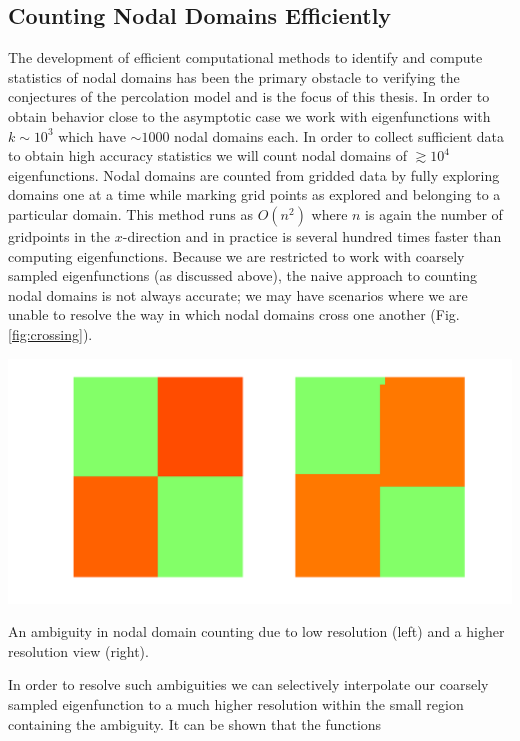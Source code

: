 \documentclass[english]{article}
\makeatletter
\newenvironment{figurehere}
{\def\@captype{figure}}
{}
\makeatother
\begin{document}
\begin{multicols}{2}
\subsection*{Counting Nodal Domains Efficiently}
The development of efficient computational methods to identify and compute statistics of nodal domains has been the primary obstacle to verifying the conjectures of the percolation model and is the focus of this thesis. In order to obtain behavior close to the asymptotic case we work with eigenfunctions with $k \sim 10^{3}$ which have $\sim 1000$ nodal domains each. In order to collect sufficient data to obtain high accuracy statistics we will count nodal domains of $\gtrsim 10^{4}$ eigenfunctions. Nodal domains are counted from gridded data by fully exploring domains one at a time while marking grid points as explored and belonging to a particular domain. This method runs as $O\left(n^{2}\right)$ where $n$ is again the number of gridpoints in the $x$-direction and in practice is several hundred times faster than computing eigenfunctions. Because we are restricted to work with coarsely sampled eigenfunctions (as discussed above), the naive approach to counting nodal domains is not always accurate; we may have scenarios where we are unable to resolve the way in which nodal domains cross one another (Fig. \ref{fig:crossing}).

\begin{figurehere}
\centering
\includegraphics[width=\columnwidth]{crossing.png}
\vspace{-30pt}
\caption{An ambiguity in nodal domain counting due to low resolution (left) and a higher resolution view (right).}
\vspace{10pt}
\label{fig:crossing}
\end{figurehere}

In order to resolve such ambiguities we can selectively interpolate our coarsely sampled eigenfunction to a much higher resolution within the small region containing the ambiguity. It can be shown that the functions


\end{multicols}
\end{document}
